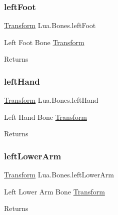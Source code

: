 \subsubsection{\texorpdfstring{leftFoot}{leftFoot}}
{\footnotesize\ttfamily \mbox{\hyperlink{class_lua_1_1_transform}{Transform}} Lua.\+Bones.\+left\+Foot\hspace{0.3cm}{\ttfamily [get]}}



Left Foot Bone \mbox{\hyperlink{class_lua_1_1_transform}{Transform}} 

\begin{DoxyReturn}{Returns}

\end{DoxyReturn}
\mbox{\label{class_lua_1_1_bones_a3242c39368adafc9965e274f49d63283}} 
\subsubsection{\texorpdfstring{leftHand}{leftHand}}
{\footnotesize\ttfamily \mbox{\hyperlink{class_lua_1_1_transform}{Transform}} Lua.\+Bones.\+left\+Hand\hspace{0.3cm}{\ttfamily [get]}}



Left Hand Bone \mbox{\hyperlink{class_lua_1_1_transform}{Transform}} 

\begin{DoxyReturn}{Returns}

\end{DoxyReturn}
\mbox{\label{class_lua_1_1_bones_ac1c0091627a3dda698685dd84d8b6e6a}} 
\subsubsection{\texorpdfstring{leftLowerArm}{leftLowerArm}}
{\footnotesize\ttfamily \mbox{\hyperlink{class_lua_1_1_transform}{Transform}} Lua.\+Bones.\+left\+Lower\+Arm\hspace{0.3cm}{\ttfamily [get]}}



Left Lower Arm Bone \mbox{\hyperlink{class_lua_1_1_transform}{Transform}} 

\begin{DoxyReturn}{Returns}

\end{DoxyReturn}
\mbox{\label{class_lua_1_1_bones_acade1832236cb1887d8d4e30af54fbef}} 
